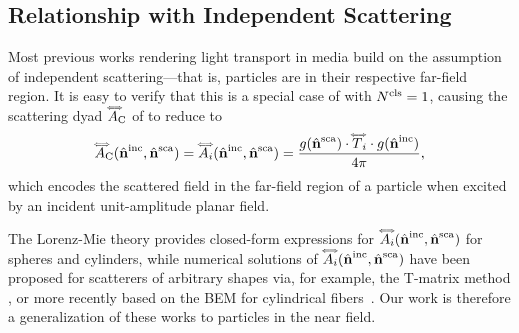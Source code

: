 \subsection{Relationship with Independent Scattering}
\label{ssec:ours_indep_scat}

Most previous works rendering light transport in media \cite{novak2018monte} build on the assumption of independent scattering---that is, particles are in their respective far-field region.
It is easy to verify that this is a special case of  with $N^\mathrm{cls}=1$, causing 
the scattering dyad ${\accentset{\Longleftrightarrow}{A}}_{\mathrm{C}}$ of  to reduce to
\begin{equation}
    \label{eq:farscatmie}
    {\accentset{\Longleftrightarrow}{A}}_{\mathrm{C}}({\hat{\mathbf{n}}}^\mathrm{inc},{\hat{\mathbf{n}}}^\mathrm{sca}) = {\accentset{\Longleftrightarrow}{A}}_i({\hat{\mathbf{n}}}^\mathrm{inc},{\hat{\mathbf{n}}}^\mathrm{sca}) = \frac{g({\hat{\mathbf{n}}}^\mathrm{sca})\cdot {\accentset{\Longleftrightarrow}{T}}_i \cdot g({\hat{\mathbf{n}}}^\mathrm{inc})}{4\pi},
\end{equation}
which encodes the scattered field in the far-field region of a particle when excited by an incident unit-amplitude planar field. 

The Lorenz-Mie theory \cite{hulst1981light} provides closed-form expressions for ${\accentset{\Longleftrightarrow}{A}}_i({\hat{\mathbf{n}}}^\mathrm{inc},{\hat{\mathbf{n}}}^\mathrm{sca})$ for spheres and cylinders, while numerical solutions of ${\accentset{\Longleftrightarrow}{A}}_i({\hat{\mathbf{n}}}^\mathrm{inc},{\hat{\mathbf{n}}}^\mathrm{sca})$ have been proposed for scatterers of arbitrary shapes via, for example, the T-matrix method \cite{waterman1965matrix}, or more recently based on the BEM for cylindrical fibers~\cite{xia2020wave}. Our work is therefore a generalization of these works to particles in the near field. 
